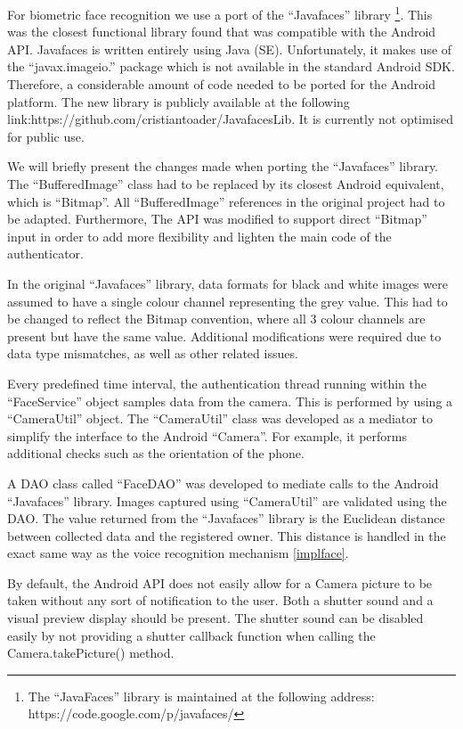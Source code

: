 For biometric face recognition we use a port of the ``Javafaces'' library \footnote{The ``JavaFaces'' library is maintained at the following address: https://code.google.com/p/javafaces/}. This was the closest functional library found that was compatible with the Android API. Javafaces is written entirely using Java (SE). Unfortunately, it makes use of the ``javax.imageio.'' package which is not available in the standard Android SDK. Therefore, a considerable amount of code needed to be ported for the Android platform. The new library is publicly available at the following link:https://github.com/cristiantoader/JavafacesLib. It is currently not optimised for public use.

We will briefly present the changes made when porting the ``Javafaces'' library. The ``BufferedImage'' class had to be replaced by its closest Android equivalent, which is ``Bitmap''. All ``BufferedImage'' references in the original project had to be adapted. Furthermore, The API was modified to support direct ``Bitmap'' input in order to add more flexibility and lighten the main code of the authenticator. 

In the original ``Javafaces'' library, data formats for black and white images were assumed to have a single colour channel representing the grey value. This had to be changed to reflect the Bitmap convention, where all 3 colour channels are present but have the same value. Additional modifications were required due to data type mismatches, as well as other related issues.

Every predefined time interval, the authentication thread running within the ``FaceService'' object samples data from the camera. This is performed by using a ``CameraUtil'' object. The ``CameraUtil'' class was developed as a mediator to simplify the interface to the Android ``Camera''. For example, it performs additional checks such as the orientation of the phone. 

A DAO class called ``FaceDAO'' was developed to mediate calls to the Android ``Javafaces'' library. Images captured using ``CameraUtil'' are validated using the DAO. The value returned from the ``Javafaces'' library is the Euclidean distance between collected data and the registered owner. This distance is handled in the exact same way as the voice recognition mechanism \ref{implface}.

By default, the Android API does not easily allow for a Camera picture to be taken without any sort of notification to the user. Both a shutter sound and a visual preview display should be present. The shutter sound can be disabled easily by not providing a shutter callback function when calling the Camera.takePicture() method. 

